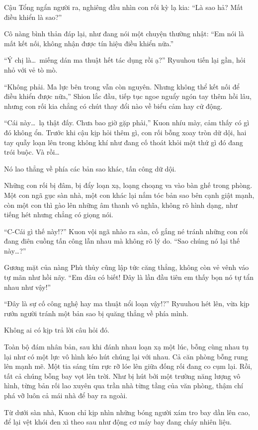 \documentclass[../main.tex]{subfiles}
\begin{document}
Cậu Tổng ngẩn người ra, nghiêng đầu nhìn con rối kỳ lạ kia: ``Là sao hả? Mất điều khiển là sao?''

Cô nàng bình thản đáp lại, như đang nói một chuyện thường nhật: ``Em nói là mất kết nối, không nhận được tín hiệu điều khiển nữa.''

``Ý chị là\dots\ miếng dán ma thuật hết tác dụng rồi ạ?'' Ryuuhou tiến lại gần, hỏi nhỏ với vẻ tò mò.

``Không phải. Ma lực bên trong vẫn còn nguyên. Nhưng không thể kết nối để điều khiển được nữa,'' Shion lắc đầu, tiếp tục ngoe nguẩy ngón tay thêm hồi lâu, nhưng con rối kia chẳng có chút thay đổi nào về biểu cảm hay cử động.

``Cái này\dots\ lạ thật đấy. Chưa bao giờ gặp phải,'' Kuon nhíu mày, cảm thấy có gì đó không ổn. Trước khi cậu kịp hỏi thêm gì, con rối bỗng xoay tròn dữ dội, hai tay quẫy loạn lên trong không khí như đang cố thoát khỏi một thứ gì đó đang trói buộc. Và rồi\dots

Nó lao thẳng về phía các bản sao khác, tấn công dữ dội.

Những con rối bị đâm, bị đẩy loạn xạ, loạng choạng va vào bàn ghế trong phòng. Một con ngã gục sàn nhà, một con khác lại nắm tóc bản sao bên cạnh giật mạnh, còn một con thì gào lên những âm thanh vô nghĩa, không rõ hình dạng, như tiếng hét nhưng chẳng có giọng nói.

``C-Cái gì thế này!?'' Kuon vội ngã nhào ra sàn, cố gắng né tránh những con rối đang điên cuồng tấn công lẫn nhau mà không rõ lý do. ``Sao chúng nó lại thế này\dots?''

Gương mặt của nàng Phù thủy cũng lập tức căng thẳng, không còn vẻ vênh váo tự mãn như hồi nãy. ``Em đâu có biết! Đây là lần đầu tiên em thấy bọn nó tự tẩn nhau như vậy!''

``Đây là sự cố công nghệ hay ma thuật nổi loạn vậy!?'' Ryuuhou hét lên, vừa kịp rướn người tránh một bản sao bị quăng thẳng về phía mình.

Không ai có kịp trả lời câu hỏi đó.

Toàn bộ đám nhân bản, sau khi đánh nhau loạn xạ một lúc, bỗng cùng nhau tụ lại như có một lực vô hình kéo hút chúng lại với nhau. Cả căn phòng bỗng rung lên mạnh mẽ. Một tia sáng tím rực rỡ lóe lên giữa đống rối đang co cụm lại. Rồi, tất cả chúng bỗng bay vọt lên trời. Như bị hút bởi một trường năng lượng vô hình, từng bản rối lao xuyên qua trần nhà từng tầng của văn phòng, thậm chí phá vỡ luôn cả mái nhà để bay ra ngoài.

Từ dưới sàn nhà, Kuon chỉ kịp nhìn những bóng người xám tro bay dần lên cao, để lại vệt khói đen xì theo sau như động cơ máy bay đang cháy nhiên liệu.
\end{document}
